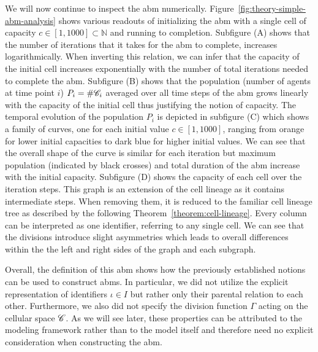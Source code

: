 We will now continue to inspect the \ac{abm} numerically.
Figure~\ref{fig:theory-simple-abm-analysis} shows various readouts of initializing the \ac{abm}
with a single cell of capacity $c\in[1,1000]\subset\mathbb{N}$ and running to completion.
Subfigure (A) shows that the number of iterations that it takes for the \ac{abm} to complete,
increases logarithmically.
When inverting this relation, we can infer that the capacity of the initial cell increases
exponentially with the number of total iterations needed to complete the \ac{abm}.
Subfigure (B) shows that the population (number of agents at time point $i$) $P_i = \#\mathscr{C}_i$
averaged over all time steps of the \ac{abm} grows linearly with the capacity of the initial cell
thus justifying the notion of capacity.
The temporal evolution of the population $P_i$ is depicted in subfigure (C) which shows a family of
curves, one for each initial value $c\in[1,1000]$, ranging from orange for lower initial capacities
to dark blue for higher initial values.
We can see that the overall shape of the curve is similar for each iteration but maximum population
(indicated by black crosses) and total duration of the \ac{abm} increase with the initial capacity.
Subfigure (D) shows the capacity of each cell over the iteration steps.
This graph is an extension of the cell lineage as it contains intermediate steps.
When removing them, it is reduced to the familiar cell lineage tree as described by the following
Theorem~\ref{theorem:cell-lineage}.
Every column can be interpreted as one identifier, referring to any single cell.
We can see that the divisions introduce slight asymmetries which leads to overall differences within
the the left and right sides of the graph and each subgraph.

Overall, the definition of this \ac{abm} shows how the previously established notions can be used to
construct \acp{abm}.
In particular, we did not utilize the explicit representation of identifiers $\iota\in I$ but
rather only their parental relation to each other.
Furthermore, we also did not specify the division function $\Gamma$ acting on the cellular space
$\mathscr{C}$.
As we will see later, these properties can be attributed to the modeling framework rather than to
the model itself and therefore need no explicit consideration when constructing the \ac{abm}.

